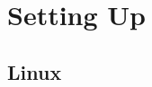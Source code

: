 \documentclass[../main.tex]{subfiles}
\begin{document}
\chapter{Setting Up}
\section{Linux}
\end{document}
